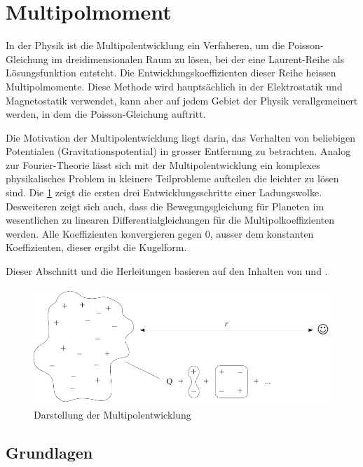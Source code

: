 %
%
%
%
\section{Multipolmoment
\label{planet:section:multipol}}
In der Physik ist die Multipolentwicklung ein Verfaheren, um die Poisson-Gleichung im dreidimensionalen Raum zu lösen, bei der eine Laurent-Reihe als Lösungsfunktion entsteht.
Die Entwicklungskoeffizienten dieser Reihe heissen Multipolmomente.
Diese Methode wird hauptsächlich in der Elektrostatik und Magnetostatik verwendet, kann aber auf jedem Gebiet der Physik verallgemeinert werden, in dem die Poisson-Gleichung auftritt.

Die Motivation der Multipolentwicklung liegt darin, das Verhalten von beliebigen Potentialen (Gravitationspotential) in grosser Entfernung zu betrachten.
Analog zur Fourier-Theorie lässt sich mit der Multipolentwicklung ein komplexes physikalisches Problem in kleinere Teilprobleme aufteilen die leichter zu lösen sind.
Die \cref{planet:fig:multipol} zeigt die ersten drei Entwicklungsschritte einer Ladungswolke.
Desweiteren zeigt sich auch, dass die Bewegungsgleichung für Planeten im wesentlichen zu linearen Differentialgleichungen für die Multipolkoeffizienten werden.
Alle Koeffizienten konvergieren gegen 0, ausser dem konstanten Koeffizienten, dieser ergibt die Kugelform.

Dieser Abschnitt und die Herleitungen basieren auf den Inhalten von \cite{planet:multi} und \cite{planet:quadro}.

\begin{figure}[h!]
    \centering
    \includegraphics[width=\linewidth]{papers/planet/pictures/Multipol.pdf}
    \caption{Darstellung der Multipolentwicklung
        \label{planet:fig:multipol}}
\end{figure}

\subsection{Grundlagen
\label{planet:subsection:grundlagen}}

